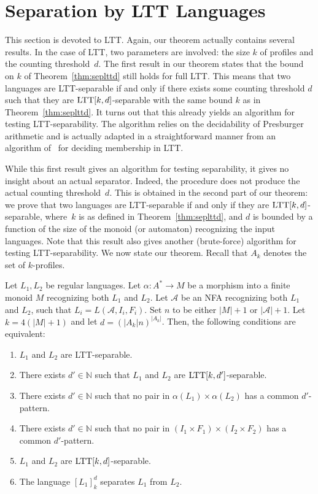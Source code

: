 \documentclass{LMCS}
\newcommand\nat{\ensuremath{\mathbb{N}}\xspace}
\newcommand\As{\ensuremath{\mathcal{A}}\xspace}
\newcommand{\ltt}{\textup{LTT}\xspace}
\newcommand\profiles[1]{$#1$-profiles\xspace}
\newcommand\kprofiles{\profiles{k}}
\newcommand{\lttclos}[3]{\ensuremath{[#1]_{#2}^{#3}}}
\theoremstyle{plain}
\begin{document}
\section{Separation by \ltt Languages}
\label{sec:ltt}
\makeatletter{}This section is devoted to \ltt. Again, our theorem actually contains
several results. In the case of \ltt, two parameters are involved: the
size $k$ of profiles and the counting threshold~$d$. The first result
in our theorem states that the bound on $k$ of Theorem~\ref{thm:seplttd}
still holds for full \ltt. This means that two languages are
\ltt-separable if and only if there exists some counting threshold $d$
such that they are $\ltt[k,d]$-separable with the same bound $k$ as in
Theorem~\ref{thm:seplttd}. It turns out that this already yields an
algorithm for testing \ltt-separability. The algorithm relies on the
decidability of Presburger arithmetic and is actually adapted in a
straightforward manner from an algorithm of~\cite{bojLTT} for deciding
membership in \ltt.

While this first result gives an algorithm for testing separability,
it gives no insight about an actual separator. Indeed, the
procedure does not produce the actual counting threshold~$d$. This is
obtained in the second part of our theorem: we prove that two
languages are \ltt-separable if and only if they are
$\ltt[k,d]$-separable, where~$k$ is as defined in
Theorem~\ref{thm:seplttd}, and $d$ is bounded by 
a function of the size of the monoid (or automaton) recognizing the
input languages. Note that this result also gives another
(brute-force) algorithm for testing \ltt-separability.
We now state our theorem. Recall that $A_k$ denotes
the set of \kprofiles.

\begin{thm}
  \label{thm:sepltt}
  Let $L_1,L_2$ be regular languages. Let $\alpha:A^*\to
  M$ be a morphism into a finite monoid $M$ recognizing both $L_1$ and $L_2$. Let $\As$
  be an NFA recognizing both $L_1$ and $L_2$, such that $L_i=L(\As,I_i,F_i)$.  Set $n$ to
  be either $|M|+1$ or $|\As|+1$. Let $k=4(|M|+1)$ and let $d=(|A_k|n)^{|A_k|}$. Then, the following
  conditions are equivalent:
  \begin{enumerate}
  \item\label{item:a3} $L_1$ and $L_2$ are \ltt-separable.
  \item\label{item:b3} There exists $d' \in \nat$ such that $L_1$ and
    $L_2$ are $\ltt[k,d']$-separable.
  \item\label{item:e3} There exists $d' \in \nat$ such that no pair in
    $\alpha(L_1)\times\alpha(L_2)$ has a common $d'$-pattern.
  \item\label{item:f3} There exists $d' \in \nat$ such that no pair in
    $(I_1\times F_1) \times(I_2\times F_2)$ has a common $d'$-pattern.
  \item\label{item:c3} $L_1$ and $L_2$ are $\ltt[k,d]$-separable.
  \item\label{item:d3} The language $\lttclos{L_1}{k}{d}$ separates
    $L_1$ from $L_2$.
  \end{enumerate}
\end{thm}
\end{document}
